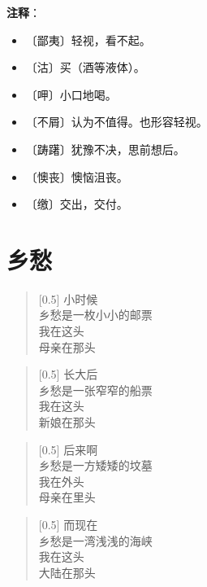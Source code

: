 \documentclass[12pt,UTF-8,openany]{ctexbook}
\begin{document}
\newpage

\textbf{注释}：

\vspace{-1em}

\begin{itemize}
    \setlength\itemsep{-0.2em}
    \item 〔鄙夷〕轻视，看不起。
    \item 〔沽〕买（酒等液体）。
    \item 〔呷〕小口地喝。
    \item 〔不屑〕认为不值得。也形容轻视。
    \item 〔踌躇〕犹豫不决，思前想后。
    \item 〔懊丧〕懊恼沮丧。
    \item 〔缴〕交出，交付。
\end{itemize}

\chapter{乡愁}

\begin{normalsize}
    
    \begin{verse}[0.5\linewidth]
        小时候 \\
        乡愁是一枚小小的邮票 \\
        我在这头 \\
        母亲在那头
    \end{verse}
    
    
    \begin{verse}[0.5\linewidth]
        长大后 \\
        乡愁是一张窄窄的船票 \\
        我在这头 \\
        新娘在那头
    \end{verse}
    
    
    \begin{verse}[0.5\linewidth]
        后来啊 \\
        乡愁是一方矮矮的坟墓 \\
        我在外头 \\
        母亲在里头
    \end{verse}
    
    
    \begin{verse}[0.5\linewidth]
        而现在 \\
        乡愁是一湾浅浅的海峡 \\
        我在这头 \\
        大陆在那头
    \end{verse}
    
\end{normalsize}
\end{document}
